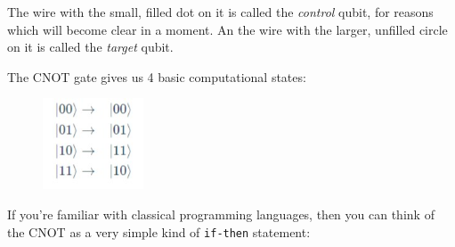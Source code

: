 \documentclass{article}
\newcommand{\code}[1]{\colorbox{light-gray}{\texttt{#1}}}
\begin{document}
The wire with the small, filled dot on it is called the \textit{control} qubit,
for reasons which will become clear in a moment. An the wire with the larger,
unfilled circle on it is called the \textit{target} qubit.

The CNOT gate gives us 4 basic computational states:

\begin{figure}[h]
    \includegraphics[width=3cm]{5.jpg}
    \centering
\end{figure}

If you're familiar with classical programming languages, then you can think of
the CNOT as a very simple kind of \code{if-then} statement:
\end{document}
